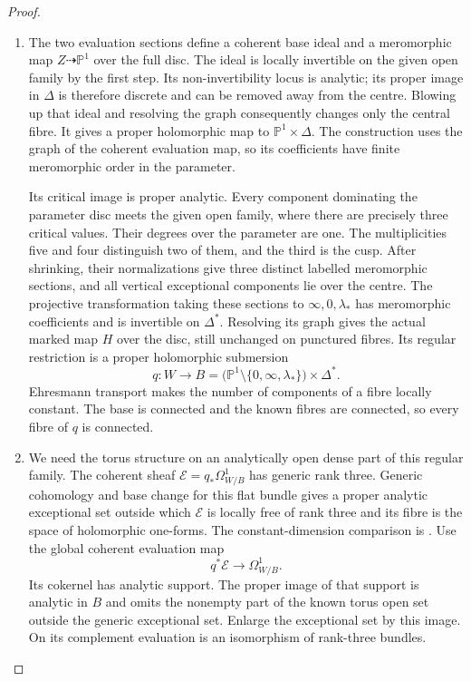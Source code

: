 \begin{proof}
\begin{enumerate}[label=\arabic*.]
\item The two evaluation sections define a coherent base ideal and
a meromorphic map $Z\dashrightarrow\mathbb P^1$ over the full
disc.  The ideal is locally invertible on the given open family
by the first step.  Its non-invertibility locus is analytic;
its proper image in $\Delta$ is therefore discrete and can be
removed away from the centre.  Blowing up that ideal and
resolving the graph consequently changes only the central
fibre.  It gives a proper holomorphic map to
$\mathbb P^1\times\Delta$.  The construction uses the graph
of the coherent evaluation map, so its coefficients have
finite meromorphic order in the parameter.

Its critical image is proper analytic.  Every component
dominating the parameter disc meets the given open family,
where there are precisely three critical values.  Their
degrees over the parameter are one.  The multiplicities five
and four distinguish two of them, and the third is the cusp.
After shrinking, their normalizations give three distinct
labelled meromorphic sections, and all vertical exceptional
components lie over the centre.  The projective transformation
taking these sections to $\infty,0,\lambda_*$ has meromorphic
coefficients and is invertible on $\Delta^*$.  Resolving its
graph gives the actual marked map $H$ over the disc, still
unchanged on punctured fibres.  Its regular restriction is a
proper holomorphic submersion
\[
 q:W\longrightarrow
 B=\bigl(\mathbb P^1\setminus\{0,\infty,\lambda_*\}\bigr)
          \times\Delta^*.
\]
Ehresmann transport makes the number of components of a fibre
locally constant.  The base is connected and the known fibres
are connected, so every fibre of $q$ is connected.

\item We need the torus structure on an analytically open dense
part of this regular family.  The coherent sheaf
$\mathcal E=q_*\Omega^1_{W/B}$ has generic rank three.
Generic cohomology and base change for this flat bundle gives
a proper analytic exceptional set outside which $\mathcal E$
is locally free of rank three and its fibre is the space of
holomorphic one-forms.  The constant-dimension comparison is
\cite[\S7, Satz 5, pp.~63--64]{Grauert60}.
Use the global coherent evaluation map
\[
 q^*\mathcal E\longrightarrow\Omega^1_{W/B}.
\]
Its cokernel has analytic support.  The proper image of that
support is analytic in $B$ and omits the nonempty part of the
known torus open set outside the generic exceptional set.
Enlarge the exceptional set by this image.  On its complement
evaluation is an isomorphism of rank-three bundles.


\end{enumerate}
\end{proof}
